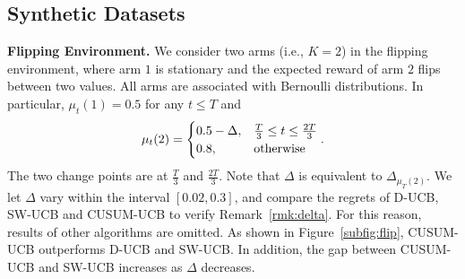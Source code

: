 \documentclass[letterpaper]{article} %
\begin{document}
\subsection{Synthetic Datasets}
{\bf Flipping Environment.}
We consider two arms (i.e., $K=2$) in the flipping environment, where arm $1$ is stationary and the expected reward of arm $2$ flips between two values. All arms are associated with Bernoulli distributions. In particular, $\mu_t(1)=0.5$ for any $t\leq T$ and
\begin{eqnarray}\label{eqn:flip}
\mu_t(2)=
\begin{cases}
0.5-\Delta, &\frac{T}{3}\leq t\leq\frac{2T}{3}\cr
0.8, &\text{otherwise}
\end{cases}.
\end{eqnarray}
The two change points are at $\frac{T}{3}$ and $\frac{2T}{3}$. Note that $\Delta$ is equivalent to $\Delta_{\mu_T(2)}$.
We let $\Delta$ vary within the interval $[0.02,0.3]$, and compare the
regrets of D-UCB, SW-UCB and CUSUM-UCB to verify Remark~\ref{rmk:delta}. For this reason, results of other algorithms are omitted.
As shown in Figure~\ref{subfig:flip}, CUSUM-UCB outperforms D-UCB and SW-UCB. In addition, the gap between CUSUM-UCB and SW-UCB increases as $\Delta$ decreases.%

\end{document}
